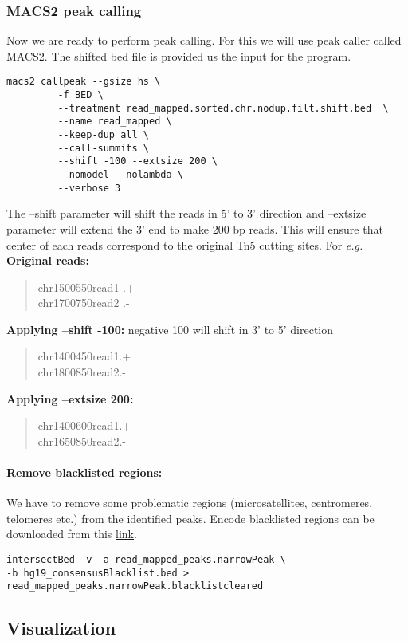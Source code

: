 \documentclass[10pt]{article}
\newcommand\tab[1][1cm]{\hspace*{#1}}
\begin{document}
\subsubsection{MACS2 peak calling} Now we are ready to perform peak calling. For this we will use  peak caller called MACS2. The shifted bed file is provided us the input for the program.
\begin{verbatim}
macs2 callpeak --gsize hs \
         -f BED \
         --treatment read_mapped.sorted.chr.nodup.filt.shift.bed  \
         --name read_mapped \
         --keep-dup all \
         --call-summits \
         --shift -100 --extsize 200 \
         --nomodel --nolambda \
         --verbose 3
\end{verbatim}
The --shift parameter  will shift the reads in 5' to 3' direction and --extsize parameter will extend the 3' end to make 200 bp reads. This will ensure that center of each reads correspond to the original Tn5 cutting sites. For {\em e.g.}\\
\textbf{Original reads:}
\begin{verse}
chr1\tab 500\tab 550\tab read1 \tab .\tab +\\
chr1\tab 700\tab 750\tab read2 \tab .\tab-
\end{verse}
\textbf{Applying --shift -100:} negative 100 will shift in 3' to 5' direction
\begin{verse}
chr1\tab 400\tab 450\tab read1\tab .\tab +\\
chr1\tab 800\tab 850\tab read2\tab .\tab -
\end{verse}
\textbf{Applying --extsize 200:}
\begin{verse}
chr1\tab 400\tab 600\tab read1\tab .\tab +\\
chr1\tab 650\tab 850\tab read2\tab .\tab -
\end{verse}
\paragraph{Remove blacklisted regions:} We have to remove some problematic regions (microsatellites, centromeres, telomeres etc.) from the identified peaks. Encode blacklisted regions can be downloaded from this \href{https://sites.google.com/site/anshulkundaje/projects/blacklists}{link}.
\begin{verbatim}
intersectBed -v -a read_mapped_peaks.narrowPeak \
-b hg19_consensusBlacklist.bed > read_mapped_peaks.narrowPeak.blacklistcleared
\end{verbatim}
\subsection{Visualization}
\end{document}
